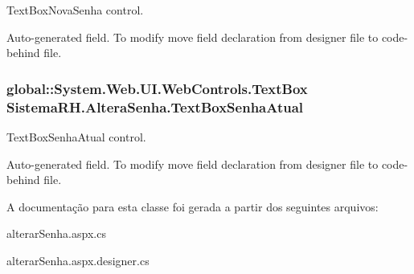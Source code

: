 TextBoxNovaSenha control. 

Auto-\/generated field. To modify move field declaration from designer file to code-\/behind file. \hypertarget{class_sistema_r_h_1_1_altera_senha_ad5de6c8ba0b3eb9fa58674a4b53531c7}{
\subsubsection[{TextBoxSenhaAtual}]{\setlength{\rightskip}{0pt plus 5cm}global::System.Web.UI.WebControls.TextBox {\bf SistemaRH.AlteraSenha.TextBoxSenhaAtual}}}
\label{class_sistema_r_h_1_1_altera_senha_ad5de6c8ba0b3eb9fa58674a4b53531c7}


TextBoxSenhaAtual control. 

Auto-\/generated field. To modify move field declaration from designer file to code-\/behind file. 

A documentação para esta classe foi gerada a partir dos seguintes arquivos:\begin{DoxyCompactItemize}
\item 
alterarSenha.aspx.cs\item 
alterarSenha.aspx.designer.cs\end{DoxyCompactItemize}
